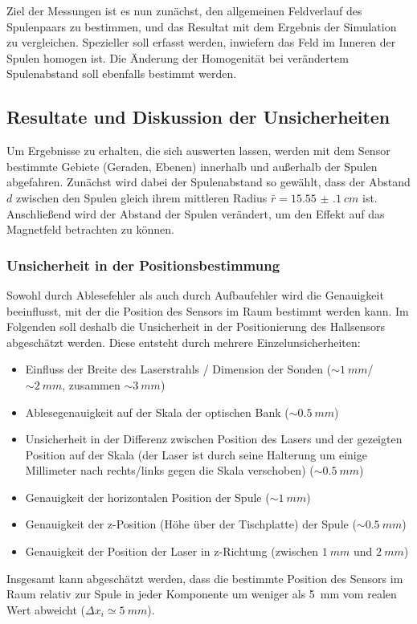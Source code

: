 \documentclass[12pt,a4paper]{article}
\begin{document}
Ziel der Messungen ist es nun zunächst, den allgemeinen Feldverlauf des Spulenpaars zu bestimmen, und das Resultat mit dem Ergebnis der Simulation zu vergleichen. Spezieller soll erfasst werden, inwiefern das Feld im Inneren der Spulen homogen ist. Die Änderung der Homogenität bei verändertem Spulenabstand soll ebenfalls bestimmt werden.
\subsection{Resultate und Diskussion der Unsicherheiten}
Um Ergebnisse zu erhalten, die sich auswerten lassen, werden mit dem Sensor bestimmte Gebiete (Geraden, Ebenen) innerhalb und außerhalb der Spulen abgefahren. Zunächst wird dabei der Spulenabstand so gewählt, dass der Abstand $d$ zwischen den Spulen gleich ihrem mittleren Radius $\bar{r}=\SI{15.55(10)}{cm}$ ist. Anschließend wird der Abstand der Spulen verändert, um den Effekt auf das Magnetfeld betrachten zu können.
\subsubsection{Unsicherheit in der Positionsbestimmung}
Sowohl durch Ablesefehler als auch durch Aufbaufehler wird die Genauigkeit beeinflusst, mit der die Position des Sensors im Raum bestimmt werden kann. Im Folgenden soll deshalb die Unsicherheit in der Positionierung des Hallsensors abgeschätzt werden. Diese entsteht durch mehrere Einzelunsicherheiten:
\begin{itemize}
	\item Einfluss der Breite des Laserstrahls / Dimension der Sonden ($\sim\SI{1}{mm}$/ $\sim\SI{2}{mm}$, zusammen $\sim\SI{3}{mm}$)
	\item Ablesegenauigkeit auf der Skala der optischen Bank ($\sim\SI{0.5}{mm}$)
	\item Unsicherheit in der Differenz zwischen Position des Lasers und der gezeigten Position auf der Skala (der Laser ist durch seine Halterung um einige Millimeter nach rechts/links gegen die Skala verschoben) ($\sim\SI{0.5}{mm}$)
	\item Genauigkeit der horizontalen Position der Spule ($\sim\SI{1}{mm}$)
	\item Genauigkeit der z-Position (Höhe über der Tischplatte) der Spule ($\sim\SI{0.5}{mm}$) 
	\item Genauigkeit der Position der Laser in z-Richtung (zwischen $\SI{1}{mm}$ und $\SI{2}{mm}$)
\end{itemize}
Insgesamt kann abgeschätzt werden, dass die bestimmte Position des Sensors im Raum relativ zur Spule in jeder Komponente um weniger als \SI{5}{mm} vom realen Wert abweicht ($\Delta x_i \simeq \SI{5}{mm}$).
\end{document}
